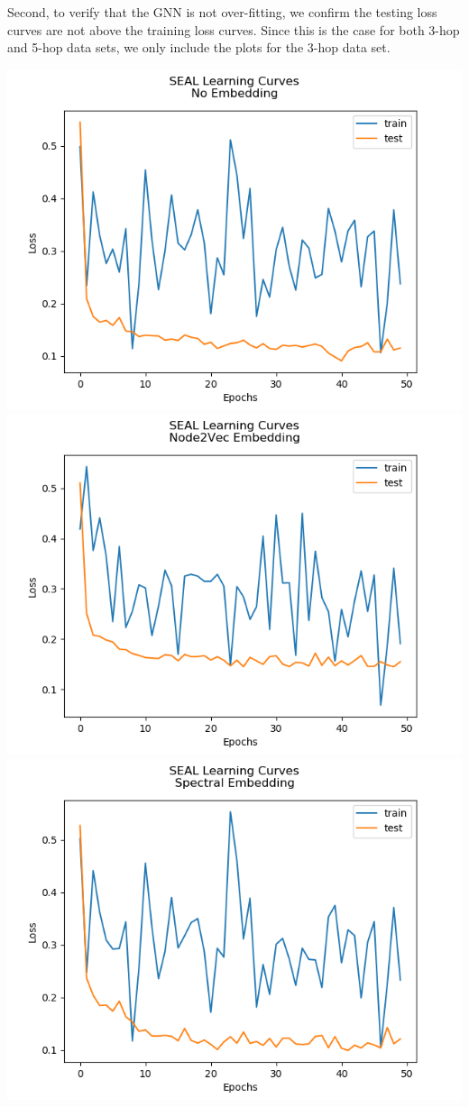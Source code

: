 \documentclass[10pt,twocolumn,letterpaper]{article}
\begin{document}
Second, to verify that the GNN is not over-fitting, we confirm the testing loss curves are not above the training loss curves. Since this is the case for both 3-hop and 5-hop data sets, we only include the plots for the 3-hop data set.
\begin{center}
\includegraphics[scale=0.35]{latex/images/No Embedding.png}
\includegraphics[scale=0.35]{latex/images/Node2Vec Embedding.png}
\includegraphics[scale=0.35]{latex/images/Spectral Embedding.png}

\end{center}
\end{document}
